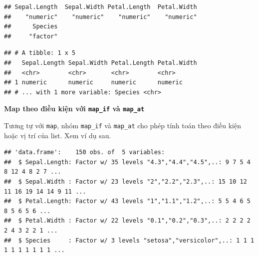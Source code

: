 \documentclass[]{krantz}
\makeatletter
\newenvironment{Shaded}{\begin{snugshade}}{\end{snugshade}}
\newcommand{\CommentTok}[1]{\textcolor[rgb]{0.37,0.37,0.37}{\textit{#1}}}
\newcommand{\KeywordTok}[1]{\textcolor[rgb]{0.27,0.27,0.27}{\textbf{#1}}}
\newcommand{\NormalTok}[1]{#1}
\newcommand{\OperatorTok}[1]{\textcolor[rgb]{0.43,0.43,0.43}{\textbf{#1}}}
\newcommand{\StringTok}[1]{\textcolor[rgb]{0.5,0.5,0.5}{#1}}
\newenvironment{kframe}{%
\medskip{}
\setlength{\fboxsep}{.8em}
 \def\at@end@of@kframe{}%
 \ifinner\ifhmode%
  \def\at@end@of@kframe{\end{minipage}}%
  \begin{minipage}{\columnwidth}%
 \fi\fi%
 \def\FrameCommand##1{\hskip\@totalleftmargin \hskip-\fboxsep
 \colorbox{shadecolor}{##1}\hskip-\fboxsep
     \hskip-\linewidth \hskip-\@totalleftmargin \hskip\columnwidth}%
 \MakeFramed {\advance\hsize-\width
   \@totalleftmargin\z@ \linewidth\hsize
   \@setminipage}}%
 {\par\unskip\endMakeFramed%
 \at@end@of@kframe}
\renewenvironment{Shaded}{\begin{kframe}}{\end{kframe}}
\renewenvironment{Shaded}{\begin{snugshade}}{\end{snugshade}}
\renewcommand{\CommentTok}[1]{\textcolor[rgb]{0.56,0.35,0.01}{\textit{#1}}}
\renewcommand{\KeywordTok}[1]{\textcolor[rgb]{0.13,0.29,0.53}{\textbf{#1}}}
\renewcommand{\NormalTok}[1]{#1}
\renewcommand{\OperatorTok}[1]{\textcolor[rgb]{0.81,0.36,0.00}{\textbf{#1}}}
\renewcommand{\StringTok}[1]{\textcolor[rgb]{0.31,0.60,0.02}{#1}}
\theoremstyle{definition}
\theoremstyle{definition}
\theoremstyle{definition}
\theoremstyle{remark}
\makeatother
\begin{document}
\begin{Shaded}
\end{Shaded}

\begin{verbatim}
## Sepal.Length  Sepal.Width Petal.Length  Petal.Width 
##    "numeric"    "numeric"    "numeric"    "numeric" 
##      Species 
##     "factor"
\end{verbatim}

\begin{Shaded}
\end{Shaded}

\begin{verbatim}
## # A tibble: 1 x 5
##   Sepal.Length Sepal.Width Petal.Length Petal.Width
##   <chr>        <chr>       <chr>        <chr>      
## 1 numeric      numeric     numeric      numeric    
## # ... with 1 more variable: Species <chr>
\end{verbatim}

\textbf{Map theo điều kiện với \texttt{map\_if} và \texttt{map\_at}}

Tương tự với \texttt{map}, nhóm \texttt{map\_if} và \texttt{map\_at} cho
phép tính toán theo điều kiện hoặc vị trí của list. Xem ví dụ sau.

\begin{Shaded}
\end{Shaded}

\begin{verbatim}
## 'data.frame':    150 obs. of  5 variables:
##  $ Sepal.Length: Factor w/ 35 levels "4.3","4.4","4.5",..: 9 7 5 4 8 12 4 8 2 7 ...
##  $ Sepal.Width : Factor w/ 23 levels "2","2.2","2.3",..: 15 10 12 11 16 19 14 14 9 11 ...
##  $ Petal.Length: Factor w/ 43 levels "1","1.1","1.2",..: 5 5 4 6 5 8 5 6 5 6 ...
##  $ Petal.Width : Factor w/ 22 levels "0.1","0.2","0.3",..: 2 2 2 2 2 4 3 2 2 1 ...
##  $ Species     : Factor w/ 3 levels "setosa","versicolor",..: 1 1 1 1 1 1 1 1 1 1 ...
\end{verbatim}
\end{document}
